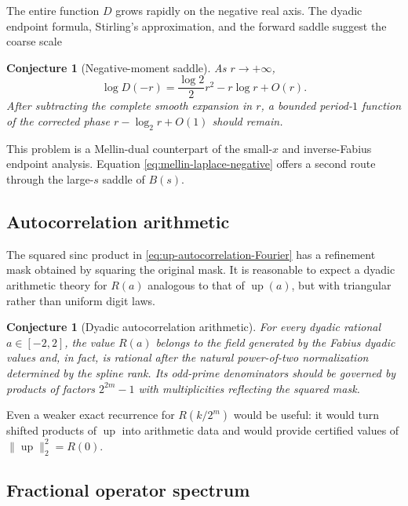 \documentclass[11pt,oneside]{article}
\newtheorem{conjecture}[theorem]{Conjecture}
\theoremstyle{definition}
\theoremstyle{remark}
\newcommand{\upf}{\operatorname{up}}
\begin{document}
The entire function $D$ grows rapidly on the negative real axis.  The dyadic endpoint formula, Stirling's approximation, and the forward saddle suggest the coarse scale
\begin{conjecture}[Negative-moment saddle]\label{conj:negative-moments}
As $r\to+\infty$,
\begin{equation}\label{eq:negative-moment-conjecture}
 \log D(-r)=\frac{\log2}{2}r^2-r\log r+O(r).
\end{equation}
After subtracting the complete smooth expansion in $r$, a bounded period-$1$ function of the corrected phase
$r-\log_2r+O(1)$ should remain.
\end{conjecture}

This problem is a Mellin-dual counterpart of the small-$x$ and inverse-Fabius endpoint analysis.  Equation \eqref{eq:mellin-laplace-negative} offers a second route through the large-$s$ saddle of $B(s)$.

\subsection{Autocorrelation arithmetic}

The squared sinc product in \eqref{eq:up-autocorrelation-Fourier} has a refinement mask obtained by squaring the original mask.  It is reasonable to expect a dyadic arithmetic theory for $R(a)$ analogous to that of $\upf(a)$, but with triangular rather than uniform digit laws.

\begin{conjecture}[Dyadic autocorrelation arithmetic]\label{conj:autocorrelation-rational}
For every dyadic rational $a\in[-2,2]$, the value $R(a)$ belongs to the field generated by the Fabius dyadic values and, in fact, is rational after the natural power-of-two normalization determined by the spline rank.  Its odd-prime denominators should be governed by products of factors $2^{2m}-1$ with multiplicities reflecting the squared mask.
\end{conjecture}

Even a weaker exact recurrence for $R(k/2^m)$ would be useful: it would turn shifted products of $\upf$ into arithmetic data and would provide certified values of $\|\upf\|_2^2=R(0)$.

\subsection{Fractional operator spectrum}
\end{document}
